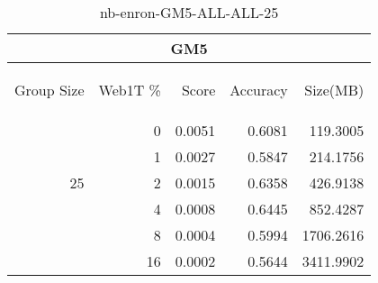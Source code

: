 \begin{center}
\begin{table}[htbp]
\begin{tabular}{ | r | r | r | r | r |}
\hline
\multicolumn{5}{|c|}{GM5}\\
\hline
\begin{sideways}Group Size\end{sideways} & \begin{sideways}Web1T \%\end{sideways} & \begin{sideways}Score\end{sideways} & \begin{sideways}Accuracy\end{sideways} & \begin{sideways}Size(MB)\end{sideways}\\
\hline
\multirow{5}{*}{25}
 & 0 & 0.0051 & 0.6081 & 119.3005\\ \cline{2-5}
 & 1 & 0.0027 & 0.5847 & 214.1756\\ \cline{2-5}
 & 2 & 0.0015 & 0.6358 & 426.9138\\ \cline{2-5}
 & 4 & 0.0008 & 0.6445 & 852.4287\\ \cline{2-5}
 & 8 & 0.0004 & 0.5994 & 1706.2616\\ \cline{2-5}
 & 16 & 0.0002 & 0.5644 & 3411.9902\\ \cline{2-5}
\hline
\end{tabular}
\caption{nb-enron-GM5-ALL-ALL-25}
\label{table:nb-enron-GM5-ALL-ALL-25}
\end{table}
\end{center}

